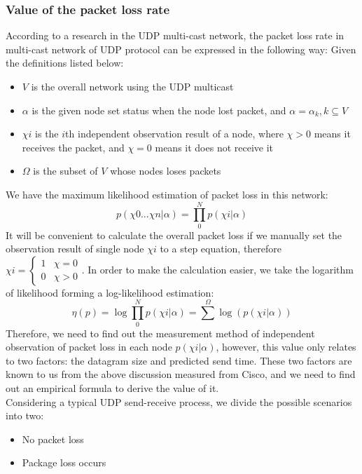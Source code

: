 \documentclass[11pt,openright,a4paper]{report}
\begin{document}
\subsubsection{Value of the packet loss rate}
According to a research in the UDP multi-cast network, the packet loss rate in multi-cast network of UDP protocol can be expressed in the following way\cite{caceres1999multicast}:
Given the definitions listed below:
\begin{itemize}
	\item $V$ is the overall network using the UDP multicast
	\item $\alpha$ is the given node set status when the node lost packet, and $\alpha = \alpha_{k},k\subseteq V$
	\item $\chi{i}$ is the $i$th independent observation result of a node, where $\chi > 0$ means it receives the packet, and $\chi =0$ means it does not receive it
	\item $\Omega$ is the subset of $V$ whose nodes loses packets
\end{itemize} 
We have the maximum likelihood estimation of packet loss in this network:
\begin{equation}
	p(\chi{0}...\chi{n}|\alpha)=\prod_{0}^{N}p(\chi{i}|\alpha)
\end{equation}
It will be convenient to calculate the overall packet loss if we manually set the observation result of single node $\chi{i}$ to a step equation, therefore $\chi{i}=\begin{cases}1 & \chi = 0 \\ 0 & \chi > 0\end{cases}$. In order to make the calculation easier, we take the logarithm of likelihood forming a log-likelihood estimation:
\begin{equation}
	\eta(p)=\log\prod_{0}^{N}p(\chi{i}|\alpha)=\sum^{\Omega}\log(p(\chi{i}|\alpha))
\end{equation} 
Therefore, we need to find out the measurement method of independent observation of packet loss in each node $p(\chi{i}|\alpha)$, however, this value only relates to two factors: the datagram size and predicted send time. These two factors are known to us from the above discussion measured from Cisco, and we need to find out an empirical formula to derive the value of it.\\
Considering a typical UDP send-receive process, we divide the possible scenarios into two:
\begin{itemize}
	\item No packet loss
	\item Package loss occurs
\end{itemize}
\end{document}
